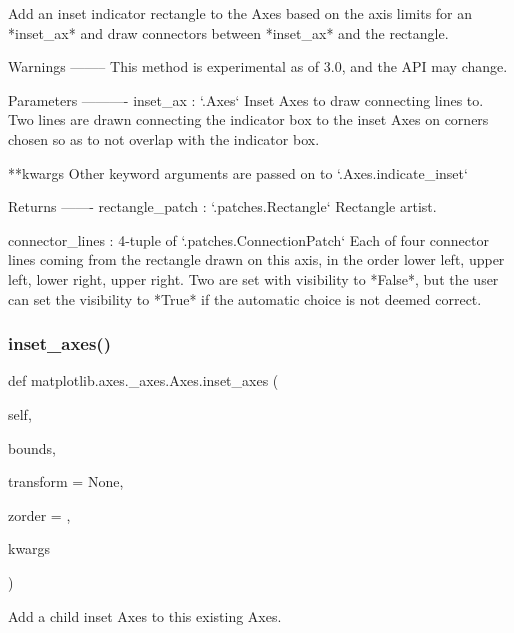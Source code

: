 \begin{DoxyVerb}
\begin{DoxyVerb}Add an inset indicator rectangle to the Axes based on the axis
limits for an *inset_ax* and draw connectors between *inset_ax*
and the rectangle.

Warnings
--------
This method is experimental as of 3.0, and the API may change.

Parameters
----------
inset_ax : `.Axes`
    Inset Axes to draw connecting lines to.  Two lines are
    drawn connecting the indicator box to the inset Axes on corners
    chosen so as to not overlap with the indicator box.

**kwargs
    Other keyword arguments are passed on to `.Axes.indicate_inset`

Returns
-------
rectangle_patch : `.patches.Rectangle`
     Rectangle artist.

connector_lines : 4-tuple of `.patches.ConnectionPatch`
    Each of four connector lines coming from the rectangle drawn on
    this axis, in the order lower left, upper left, lower right,
    upper right.
    Two are set with visibility to *False*,  but the user can
    set the visibility to *True* if the automatic choice is not deemed
    correct.
\end{DoxyVerb}
 \mbox{\label{classmatplotlib_1_1axes_1_1__axes_1_1Axes_aa7210b72a2a1b8d0d8d29b5d425bf228}} 
\subsubsection{\texorpdfstring{inset\+\_\+axes()}{inset\_axes()}}
{\footnotesize\ttfamily def matplotlib.\+axes.\+\_\+axes.\+Axes.\+inset\+\_\+axes (\begin{DoxyParamCaption}\item[{}]{self,  }\item[{}]{bounds,  }\item[{}]{transform = {\ttfamily None},  }\item[{}]{zorder = {},  }\item[{}]{kwargs }\end{DoxyParamCaption})}

\begin{DoxyVerb}Add a child inset Axes to this existing Axes.


\end{DoxyVerb}
\end{DoxyVerb}
